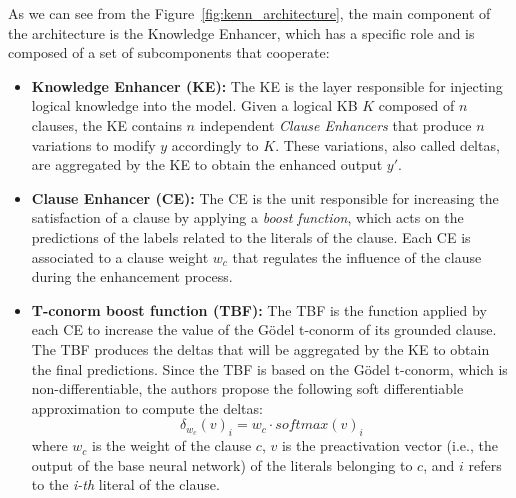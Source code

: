 As we can see from the Figure~\ref{fig:kenn_architecture}, the main component of the architecture is the Knowledge Enhancer, which has a specific role and is composed of a set of subcomponents that cooperate:
\begin{itemize}
    \item \textbf{Knowledge Enhancer (KE):} The KE is the layer responsible for injecting logical knowledge into the model. Given a logical KB $K$ composed of $n$ clauses, the KE contains $n$ independent \textit{Clause Enhancers} that produce $n$ variations to modify $y$ accordingly to $K$. These variations, also called deltas, are aggregated by the KE to obtain the enhanced output $y'$.
    \item \textbf{Clause Enhancer (CE):} The CE is the unit responsible for increasing the satisfaction of a clause by applying a \textit{boost function}, which acts on the predictions of the labels related to the literals of the clause. Each CE is associated to a clause weight $w_c$ that regulates the influence of the clause during the enhancement process.
    \item \textbf{T-conorm boost function (TBF):} The TBF is the function applied by each CE to increase the value of the Gödel t-conorm of its grounded clause. The TBF produces the deltas that will be aggregated by the KE to obtain the final predictions. Since the TBF is based on the Gödel t-conorm, which is non-differentiable, the authors propose the following soft differentiable approximation to compute the deltas:
    \begin{equation} \label{eq:tbf}
    	\delta _{w_{c}}(v)_{i} = w_{c} \cdot softmax(v)_{i}
    \end{equation}
    where $ w_{c} $ is the weight of the clause $ c $, $ v $ is the preactivation vector (i.e., the output of the base neural network) of the literals belonging to $c$, and $ i $ refers to the \textit{i-th} literal of the clause.
\end{itemize}

